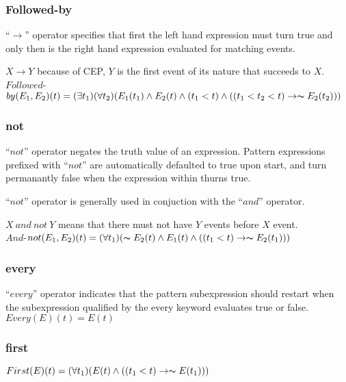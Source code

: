 \subsubsection*{Followed-by}
``$\rightarrow$'' operator specifies that first the left hand expression must turn true and only then is the right hand expression evaluated for matching events.

$X\rightarrow Y$ because of CEP, $Y$ is the first event of its nature that succeeds to $X$.\\
\newline
$Followed$-\(by(E_1,E_2)(t)=(\exists t_1)(\forall t_2)(E_1(t_1)\wedge E_2(t)\wedge (t_1<t)\wedge ((t_1<t_2<t)\rightarrow \thicksim E_2(t_2)) )\)

\subsubsection*{not}
``$not$'' operator negates the truth value of an expression. Pattern expressions prefixed with ``$not$'' are automatically defaulted to true upon start, and turn permanantly false when the expression within thurns true. 

``$not$'' operator is generally used in conjuction with the ``$and$'' operator.

$X\ and\ not\ Y$ means that there must not have $Y$ events before $X$ event.\\
\newline
$And$-\(not(E_1,E_2)(t)=(\forall t_1)(\thicksim E_2(t)\wedge E_1(t)\wedge ((t_1<t)\rightarrow \thicksim E_2(t_1)))\)

\subsubsection*{every}
``$every$'' operator indicates that the pattern subexpression should restart when the subexpression qualified by the every keyword evaluates true or false.\\
\newline
\(Every(E)(t)=E(t)\)

\subsubsection*{first}

\(First(E)(t)=(\forall t_1)(E(t)\wedge ((t_1<t)\rightarrow \thicksim E(t_1)))\)

